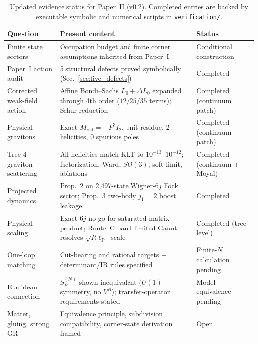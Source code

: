 \documentclass[11pt]{article}
\newcommand{\lP}{\ell_{\mathrm{P}}}
\begin{document}
\begin{table}[t]
\centering
\caption{Updated evidence status for Paper~II (v0.2). Completed entries are backed by executable symbolic and numerical scripts in \texttt{verification/}.}
\label{tab:status}
\small
\begin{tabular}{@{}p{}p{}p{}@{}}
\toprule
Question & Present content & Status \\
\midrule
Finite state sectors & Occupation budget and finite corner assumptions inherited from Paper~I & Conditional construction \\
Paper~I action audit & 5 structural defects proved symbolically (Sec.~\ref{sec:five_defects}) & Completed \\
Corrected weak-field action & Affine Bondi--Sachs $L_0+\Delta L_0$ expanded through 4th order ($12/25/35$ terms); Schur reduction & Completed (continuum patch) \\
Physical gravitons & Exact $M_{\mathrm{red}} = -P^2 I_2$, unit residue, 2 helicities, 0 spurious poles & Completed (continuum patch) \\
Tree 4-graviton scattering & All helicities match KLT to $10^{-13}\text{--}10^{-12}$; factorization, Ward, $SO(3)$, soft limit, ablations & Completed (continuum + Moyal) \\
Projected dynamics & Prop.~2 on 2,497-state Wigner-$6j$ Fock sector; Prop.~3 two-body $j_1=2$ boost leakage & Completed \\
Physical scaling & Exact $6j$ no-go for saturated matrix product; Route~C band-limited Gaunt resolves $\sqrt{R\lP}$ scale & Completed (tree level) \\
One-loop matching & Cut-bearing and rational targets + determinant/IR rules specified & Finite-$N$ calculation pending \\
Euclidean connection & $S_E^{(N)}$ shown inequivalent ($U(1)$ symmetry, no $V^A$); transfer-operator requirements stated & Model equivalence pending \\
Matter, gluing, strong GR & Equivalence principle, subdivision compatibility, corner-state derivation framed & Open \\
\bottomrule
\end{tabular}
\end{table}
\end{document}
